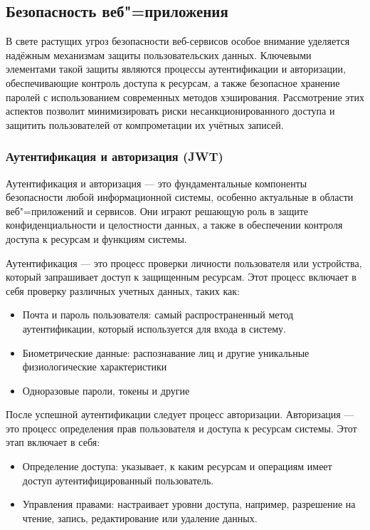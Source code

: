 \subsection{Безопасность веб"=приложения}

В свете растущих угроз безопасности веб-сервисов особое внимание уделяется надёжным механизмам защиты пользовательских данных. Ключевыми элементами такой защиты являются процессы аутентификации и авторизации, обеспечивающие контроль доступа к ресурсам, а также безопасное хранение паролей с использованием современных методов хэширования. Рассмотрение этих аспектов позволит минимизировать риски несанкционированного доступа и защитить пользователей от компрометации их учётных записей.

\subsubsection{Аутентификация и авторизация (JWT)}

Аутентификация и авторизация --- это фундаментальные компоненты безопасности любой информационной системы, особенно актуальные в области веб"=приложений и сервисов. Они играют решающую роль в защите конфиденциальности и целостности данных, а также в обеспечении контроля доступа к ресурсам и функциям системы.\cite{jwt1}

Аутентификация --- это процесс проверки личности пользователя или устройства, который запрашивает доступ к защищенным ресурсам. Этот процесс включает в себя проверку различных учетных данных, таких как:
\begin{itemize}
	\item{Почта и пароль пользователя: самый распространенный метод аутентификации, который используется для входа в систему.}
	\item{Биометрические данные: распознавание лиц и другие уникальные физиологические характеристики}
	\item{Одноразовые пароли, токены и другие}
\end{itemize}

После успешной аутентификации следует процесс авторизации. Авторизация --- это процесс определения прав пользователя и доступа к ресурсам системы. Этот этап включает в себя:
\begin{itemize}
	\item{Определение доступа: указывает, к каким ресурсам и операциям имеет доступ аутентифицированный пользователь.}
	\item{Управления правами: настраивает уровни доступа, например, разрешение на чтение, запись, редактирование или удаление данных.}
\end{itemize}

